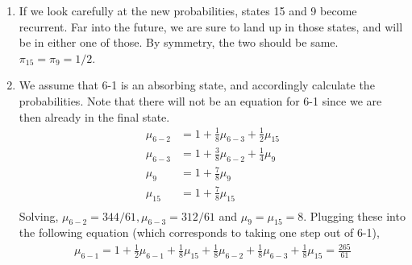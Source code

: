 \documentclass[../../probability-notes.tex]{subfile}
\begin{document}
\begin{enumerate}
            \item If we look carefully at the new probabilities, states 15 and 9 become recurrent. Far into the future, we are sure to land up in those states, and will be in either one of those. By symmetry, the two should be same. $\pi_{15} = \pi_{9} = 1/2$.

            \item We assume that 6-1 is an absorbing state, and accordingly calculate the probabilities. Note that there will not be an equation for 6-1 since we are then already in the final state.
            \begin{align*}
                \mu_{6-2} &= 1 + \frac{1}{8} \mu_{6-3} + \frac{1}{2} \mu_{15}\\
                \mu_{6-3} &= 1 + \frac{3}{8} \mu_{6-2} + \frac{1}{4} \mu_{9}\\
                \mu_{9} &= 1 + \frac{7}{8} \mu_{9}\\
                \mu_{15} &= 1 + \frac{7}{8} \mu_{15}\\
            \end{align*}
            Solving, $\mu_{6-2} = 344/61, \mu_{6-3} = 312/61$ and $\mu_{9} = \mu_{15} = 8$. Plugging these into the following equation (which corresponds to taking one step out of 6-1),
            \begin{align*}
                \mu_{6-1} = 1 + \frac{1}{2} \mu_{6-1} + \frac{1}{8} \mu_{15} + \frac{1}{8} \mu_{6-2} + \frac{1}{8} \mu_{6-3} + \frac{1}{8} \mu_{15} = \frac{265}{61}
            \end{align*}
        \end{enumerate}
\end{document}
